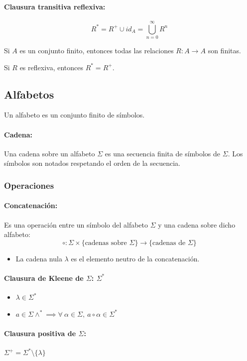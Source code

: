 \paragraph{Clausura transitiva reflexiva:} \[ R^* = R^+ \cup id_A = \bigcup_{n=0}^\infty R^n\]

Si \(A\) es un conjunto finito, entonces todas las relaciones \(R:A\to A\) son finitas.

Si \(R\) es reflexiva, entonces \(R^* = R^+\).

\subsection{Alfabetos}
Un alfabeto es un conjunto finito de símbolos.

\paragraph{Cadena:} Una cadena sobre un alfabeto \(\Sigma\) es una secuencia finita de símbolos de \(\Sigma\). Los símbolos son notados respetando el orden de la secuencia.

\subsubsection{Operaciones}
\paragraph{Concatenación:} Es una operación entre un símbolo del alfabeto \(\Sigma\) y una cadena sobre dicho alfabeto:
\[ \circ : \Sigma\times\{\text{cadenas sobre }\Sigma\}\to\{\text{cadenas de }\Sigma\}\]
\begin{itemize}
  \item La cadena nula \(\lambda\) es el elemento neutro de la concatenación.
\end{itemize}

\paragraph{Clausura de Kleene de \(\Sigma\): \(\Sigma^*\)}
\begin{itemize}
  \item \(\lambda\in\Sigma^*\)
  \item \(a\in\Sigma \land^*\implies \forall~\alpha\in\Sigma,~a\circ\alpha\in\Sigma^*\)
\end{itemize}

\paragraph{Clausura positiva de \(\Sigma\):} \(\Sigma^+ = \Sigma^*\setminus\{\lambda\}\)

